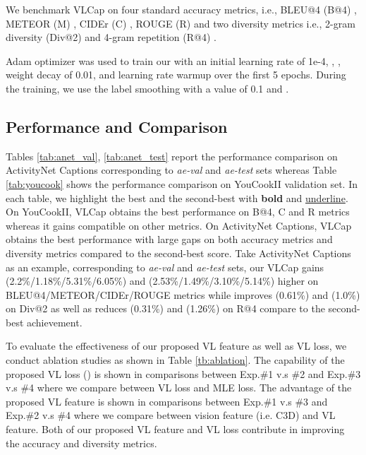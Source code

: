 \documentclass{article}
\begin{document}
We benchmark VLCap on four standard accuracy metrics, i.e., BLEU@4 (B@4) \cite{papineni2002bleu}, METEOR (M) \cite{denkowski2014meteor}, CIDEr (C) \cite{vedantam2015cider}, ROUGE (R) \cite{lin2004rouge} and two diversity metrics i.e., 2-gram diversity (Div@2) \cite{div} and 4-gram repetition (R@4) \cite{xiong2018move}. 

Adam optimizer was used to train our \model with an initial learning rate of 1e-4, , ,  weight decay of 0.01, and learning rate warmup over the first 5 epochs. During the training, we use the label smoothing with a value of 0.1 and . 
\vspace{-4mm}

\subsection{Performance and Comparison}
\vspace{-2mm}

Tables \ref{tab:anet_val}, \ref{tab:anet_test} report the performance comparison on ActivityNet Captions corresponding to \textit{ae-val} and \textit{ae-test} sets whereas Table \ref{tab:youcook} shows the performance comparison on YouCookII validation set. In each table, we highlight the best and the second-best with \textbf{bold} and \underline{underline}. On YouCookII, VLCap obtains the best performance on B@4, C and R metrics whereas it gains compatible on other metrics. On ActivityNet Captions, VLCap obtains the best performance with large gaps on both accuracy metrics and diversity metrics compared to the second-best score. Take ActivityNet Captions as an example, corresponding to \textit{ae-val} and \textit{ae-test} sets, our VLCap gains (2.2\%/1.18\%/5.31\%/6.05\%) and (2.53\%/1.49\%/3.10\%/5.14\%) higher on BLEU@4/METEOR/CIDEr/ROUGE metrics while improves (0.61\%) and (1.0\%) on Div@2 as well as reduces (0.31\%) and (1.26\%) on R@4 compare to the second-best achievement.  

To evaluate the effectiveness of our proposed VL feature as well as VL loss, we conduct ablation studies as shown in Table \ref{tb:ablation}. The capability of the proposed VL loss () is shown in comparisons between Exp.\#1 v.s \#2 and  Exp.\#3 v.s \#4 where we compare between VL loss and MLE loss. The advantage of the proposed VL feature is shown in comparisons between Exp.\#1 v.s \#3 and Exp.\#2 v.s \#4 where we compare between vision feature (i.e. C3D) and VL feature. Both of our proposed VL feature and VL loss contribute in improving the accuracy and diversity metrics.
\end{document}
